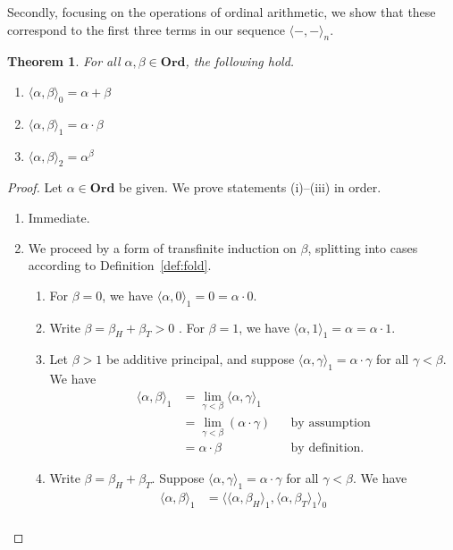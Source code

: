 \documentclass[12pt, a4paper]{article}
\newtheorem{theorem}{Theorem}[section]
\theoremstyle{definition}
\theoremstyle{remark}
\newcommand{\ord}{\mathbf{Ord}}
\newcommand{\op}[2]{\langle#1, #2\rangle}
\begin{document}
Secondly, focusing on the operations of ordinal arithmetic, we show that these correspond to the first three terms in our sequence $\op--_n$.

\begin{theorem}
    For all $\alpha, \beta \in \ord$, the following hold.
    \begin{enumerate}
        \item[\textnormal{(i)}] $\op\alpha\beta_0 = \alpha + \beta$
        \item[\textnormal{(ii)}] $\op\alpha\beta_1 = \alpha \cdot \beta$
        \item[\textnormal{(iii)}] $\op\alpha\beta_2 = \alpha^\beta$
    \end{enumerate}
\end{theorem}

\begin{proof}
    Let $\alpha \in \ord$ be given. We prove statements (i)--(iii) in order.
    \begin{enumerate}
        \item[(i)] Immediate.
        \item[(ii)] We proceed by a form of transfinite induction on $\beta$, splitting into cases according to Definition~\ref{def:fold}.
        \begin{enumerate}
            \item[(1)] For $\beta = 0$, we have $\op\alpha0_1 = 0 = \alpha\cdot0$.
            \item[(2)] Write $\beta = \beta_H + \beta_T > 0$ . For $\beta = 1$, we have $\op\alpha1_1 = \alpha = \alpha\cdot1$.
            \item[(3)] Let $\beta > 1$ be additive principal, and suppose $\op\alpha\gamma_1 = \alpha \cdot \gamma$ for all $\gamma < \beta$. We have
                \begin{align*}
                    \op\alpha\beta_1 &= \textstyle\lim_{\gamma < \beta} {\op\alpha\gamma_1} && \\
                    &= \textstyle\lim_{\gamma < \beta} {(\alpha \cdot \gamma)} && \text{by assumption} \\
                    &= \alpha \cdot \beta && \text{by definition.}
                \end{align*}
            \item[(4)] Write $\beta = \beta_H + \beta_T$. Suppose $\op\alpha\gamma_1 = \alpha \cdot \gamma$ for all $\gamma < \beta$. We have
                \begin{align*}
                    \op\alpha\beta_1 &= \op{\op\alpha{\beta_H}_1}{\op\alpha{\beta_T}_1}_0 && \\

\end{align*}
\end{enumerate}
\end{enumerate}
\end{proof}
\end{document}
